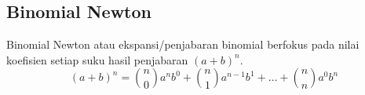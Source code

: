 \subsection{Binomial Newton}
Binomial Newton atau ekspansi/penjabaran binomial berfokus pada nilai koefisien setiap suku hasil penjabaran $(a+b)^n$.
$$(a+b)^n = {n \choose 0} a^nb^0 + {n \choose 1} a^{n-1}b^1+ \dots +{n \choose n}a^0b^n$$


